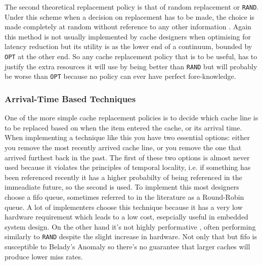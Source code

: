 The second theoretical replacement policy is that of random replacement or \texttt{RAND}. Under this scheme when a decision on replacement has to be made, the choice is made completely at random without reference to any other information \cite{beladyStudyReplacementAlgorithms1966}. Again this method is not usually implemented by cache designers when optimising for latency reduction \cite{karedlaCachingStrategiesImprove1994} but its utility is as the lower end of a continuum, bounded by \texttt{OPT} at the other end. So any cache replacement policy that is to be useful, has to justify the extra resources it will use by being better than \texttt{RAND} but will probably be worse than \texttt{OPT} because no policy can ever have perfect fore-knowledge.

\subsubsection{Arrival-Time Based Techniques}

One of the more simple cache replacement policies is to decide which cache line is to be replaced based on when the item entered the cache, or its arrival time. When implementing a technique like this you have two essential options: either you remove the most recently arrived cache line, or you remove the one that arrived furthest back in the past. The first of these two options is almost never used because it violates the principles of temporal locality, i.e. if something has been referenced recently it has a higher probabilty of being referenced in the immeadiate future, so the second is used. To implement this most designers choose a \gls{fifo} queue, sometimes referred to in the literature as a Round-Robin queue. A lot of implementers choose this technique because it has a very low hardware requirement \cite{pandaSurveyReplacementStrategies2016} which leads to a low cost, esepcially useful in embedded system design. On the other hand it's not highly performative \cite{al-zoubiPerformanceEvaluationCache2004, tsaoMultiFactorPagingExperiment1972}, often performing similarly to \texttt{RAND} despite the slight increase in hardware. Not only that but \gls{fifo} is susceptible to Belady's Anomaly \cite{beladyAnomalySpacetimeCharacteristics1969} so there's no guarantee that larger caches will produce lower miss rates. 

